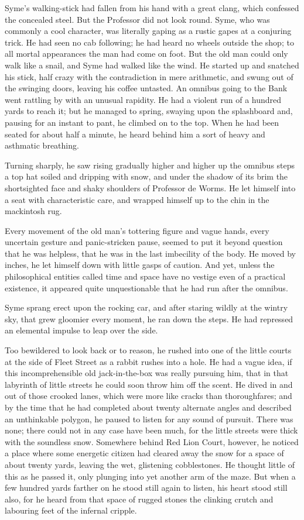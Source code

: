 Syme’s walking-stick had fallen from his hand with a great clang, which confessed the concealed steel. But the Professor did not look round. Syme, who was commonly a cool character, was literally gaping as a rustic gapes at a conjuring trick. He had seen no cab following; he had heard no wheels outside the shop; to all mortal appearances the man had come on foot. But the old man could only walk like a snail, and Syme had walked like the wind. He started up and snatched his stick, half crazy with the contradiction in mere arithmetic, and swung out of the swinging doors, leaving his coffee untasted. An omnibus going to the Bank went rattling by with an unusual rapidity. He had a violent run of a hundred yards to reach it; but he managed to spring, swaying upon the splashboard and, pausing for an instant to pant, he climbed on to the top. When he had been seated for about half a minute, he heard behind him a sort of heavy and asthmatic breathing.

Turning sharply, he saw rising gradually higher and higher up the omnibus steps a top hat soiled and dripping with snow, and under the shadow of its brim the shortsighted face and shaky shoulders of Professor de Worms. He let himself into a seat with characteristic care, and wrapped himself up to the chin in the mackintosh rug.

Every movement of the old man’s tottering figure and vague hands, every uncertain gesture and panic-stricken pause, seemed to put it beyond question that he was helpless, that he was in the last imbecility of the body. He moved by inches, he let himself down with little gasps of caution. And yet, unless the philosophical entities called time and space have no vestige even of a practical existence, it appeared quite unquestionable that he had run after the omnibus.

Syme sprang erect upon the rocking car, and after staring wildly at the wintry sky, that grew gloomier every moment, he ran down the steps. He had repressed an elemental impulse to leap over the side.

Too bewildered to look back or to reason, he rushed into one of the little courts at the side of Fleet Street as a rabbit rushes into a hole. He had a vague idea, if this incomprehensible old jack-in-the-box was really pursuing him, that in that labyrinth of little streets he could soon throw him off the scent. He dived in and out of those crooked lanes, which were more like cracks than thoroughfares; and by the time that he had completed about twenty alternate angles and described an unthinkable polygon, he paused to listen for any sound of pursuit. There was none; there could not in any case have been much, for the little streets were thick with the soundless snow. Somewhere behind Red Lion Court, however, he noticed a place where some energetic citizen had cleared away the snow for a space of about twenty yards, leaving the wet, glistening cobblestones. He thought little of this as he passed it, only plunging into yet another arm of the maze. But when a few hundred yards farther on he stood still again to listen, his heart stood still also, for he heard from that space of rugged stones the clinking crutch and labouring feet of the infernal cripple.

